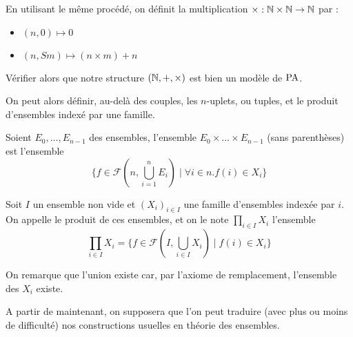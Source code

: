 \begin{defi}[Multiplication]
    En utilisant le même procédé, on définit la multiplication $\times : \mathbb{N}\times\mathbb{N}\to\mathbb{N}$ par :
    \begin{itemize}[label=$\bullet$]
        \item $(n,0)\mapsto 0$
        \item $(n,Sm)\mapsto (n\times m)+n$
    \end{itemize}
\end{defi}

\begin{exo}
    Vérifier alors que notre structure $(\mathbb{N},+,\times)$ est bien un modèle de $\mathrm{PA}$.
\end{exo}

On peut alors définir, au-delà des couples, les $n$-uplets, ou tuples, et le produit d'ensembles indexé par une famille.

\begin{defi}[Tuple]
    Soient $E_0,\ldots,E_{n-1}$ des ensembles, l'ensemble $E_0\times \ldots \times E_{n-1}$ (sans parenthèses) est l'ensemble $$\{ f\in \mathcal F(n,\bigcup_{i=1}^n E_i)\mid \forall i\in n. f(i)\in X_i\}$$
\end{defi}

\begin{defi}
    Soit $I$ un ensemble non vide et $(X_i)_{i\in I}$ une famille d'ensembles indexée par $i$. On appelle le produit de ces ensembles, et on le note $\displaystyle{\prod_{i\in I} X_i}$ l'ensemble $$\prod_{i\in I}X_i = \{ f\in\mathcal F(I,\bigcup_{i\in I} X_i) \mid f(i)\in X_i\}$$

    On remarque que l'union existe car, par l'axiome de remplacement, l'ensemble des $X_i$ existe.
\end{defi}

A partir de maintenant, on supposera que l'on peut traduire (avec plus ou moins de difficulté) nos constructions usuelles en théorie des ensembles.